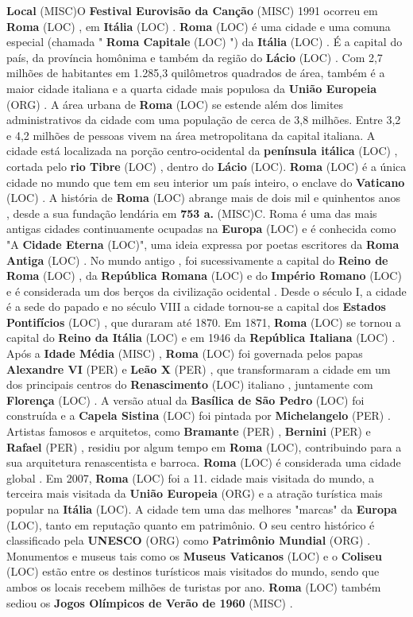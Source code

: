 \documentclass[12pt,a4paper]{article}
\begin{document}
\textbf{Local} (MISC)O \textbf{Festival Eurovisão da Canção} (MISC) 1991 ocorreu em \textbf{Roma} (LOC) , em \textbf{Itália} (LOC) . \textbf{Roma} (LOC) é uma cidade e uma comuna especial (chamada " \textbf{Roma Capitale} (LOC) ") da \textbf{Itália} (LOC) . É a capital do país, da província homônima e também da região do \textbf{Lácio} (LOC) . Com 2,7 milhões de habitantes em 1.285,3 quilômetros quadrados de área, também é a maior cidade italiana e a quarta cidade mais populosa da \textbf{União Europeia} (ORG) . A área urbana de \textbf{Roma} (LOC) se estende além dos limites administrativos da cidade com uma população de cerca de 3,8 milhões. Entre 3,2 e 4,2 milhões de pessoas vivem na área metropolitana da capital italiana. A cidade está localizada na porção centro-ocidental da \textbf{península itálica} (LOC) , cortada pelo \textbf{rio Tibre} (LOC) , dentro do \textbf{Lácio} (LOC). \textbf{Roma} (LOC) é a única cidade no mundo que tem em seu interior um país inteiro, o enclave do \textbf{Vaticano} (LOC) . A história de \textbf{Roma} (LOC) abrange mais de dois mil e quinhentos anos , desde a sua fundação lendária em \textbf{753 a.} (MISC)C. Roma é uma das mais antigas cidades continuamente ocupadas na \textbf{Europa} (LOC) e é conhecida como "A \textbf{Cidade Eterna} (LOC)", uma ideia expressa por poetas escritores da \textbf{Roma Antiga} (LOC) . No mundo antigo , foi sucessivamente a capital do \textbf{Reino de Roma} (LOC) , da \textbf{República Romana} (LOC) e do \textbf{Império Romano} (LOC) e é considerada um dos berços da civilização ocidental . Desde o século I, a cidade é a sede do papado e no século VIII a cidade tornou-se a capital dos \textbf{Estados Pontifícios} (LOC) , que duraram até 1870. Em 1871, \textbf{Roma} (LOC) se tornou a capital do \textbf{Reino da Itália} (LOC) e em 1946 da \textbf{República Italiana} (LOC) . Após a \textbf{Idade Média} (MISC) , \textbf{Roma} (LOC) foi governada pelos papas \textbf{Alexandre VI} (PER) e \textbf{Leão X} (PER) , que transformaram a cidade em um dos principais centros do \textbf{Renascimento} (LOC) italiano , juntamente com \textbf{Florença} (LOC) . A versão atual da \textbf{Basílica de São Pedro} (LOC) foi construída e a \textbf{Capela Sistina} (LOC) foi pintada por \textbf{Michelangelo} (PER) . Artistas famosos e arquitetos, como \textbf{Bramante} (PER) , \textbf{Bernini} (PER) e \textbf{Rafael} (PER) , residiu por algum tempo em \textbf{Roma} (LOC), contribuindo para a sua arquitetura renascentista e barroca. \textbf{Roma} (LOC) é considerada uma cidade global . Em 2007, \textbf{Roma} (LOC) foi a 11. cidade mais visitada do mundo, a terceira mais visitada da \textbf{União Europeia} (ORG) e a atração turística mais popular na \textbf{Itália} (LOC). A cidade tem uma das melhores "marcas" da \textbf{Europa} (LOC), tanto em reputação quanto em patrimônio. O seu centro histórico é classificado pela \textbf{UNESCO} (ORG) como \textbf{Patrimônio Mundial} (ORG) . Monumentos e museus tais como os \textbf{Museus Vaticanos} (LOC) e o \textbf{Coliseu} (LOC) estão entre os destinos turísticos mais visitados do mundo, sendo que ambos os locais recebem milhões de turistas por ano. \textbf{Roma} (LOC) também sediou os \textbf{Jogos Olímpicos de Verão de 1960} (MISC) .
\end{document}
